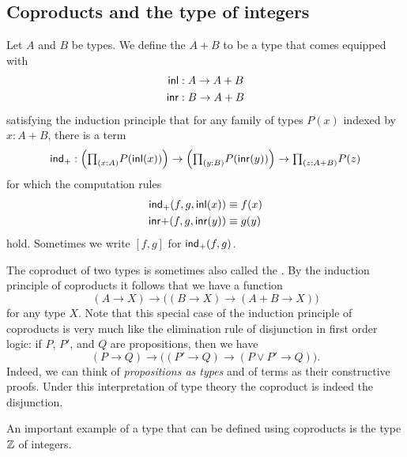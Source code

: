 \subsection{Coproducts and the type of integers}
\begin{defn}
Let $A$ and $B$ be types. We define the  $A+B$ to be a type that comes equipped with
\begin{align*}
{\mathsf{inl}} & : A \to A+B \\
{\mathsf{inr}} & : B \to A+B
\end{align*}
satisfying the induction principle that for any family of types $P(x)$ indexed by $x:A+B$, there is a term
\begin{equation*}
\ind{+} : \Big(\prd{x:A}P(\inl(x))\Big)\to\Big(\prd{y:B}P(\inr(y))\Big)\to\prd{z:A+B}P(z)
\end{equation*}
for which the computation rules
\begin{align*}
\mathsf{ind}_{+}(f,g,{\mathsf{inl}}(x)) & \equiv f(x) \\
{\mathsf{inr}}{+}(f,g,{\mathsf{inr}}(y)) & \equiv g(y)
\end{align*}
hold. Sometimes we write $[f,g]$ for $\mathsf{ind}_{+}(f,g)$.
\end{defn}

The coproduct of two types is sometimes also called the . By the induction principle of coproducts it follows that we have a function
\begin{equation*}
  (A\to X) \to \big((B\to X) \to (A+B\to X)\big)
\end{equation*}
for any type $X$. Note that this special case of the induction principle of coproducts is very much like the elimination rule of disjunction in first order logic: if $P$, $P'$, and $Q$ are propositions, then we have
\begin{equation*}
  (P\to Q)\to \big((P'\to Q)\to (P\lor P'\to Q)\big).
\end{equation*}
Indeed, we can think of \emph{propositions as types} and of terms as their constructive proofs. Under this interpretation of type theory the coproduct is indeed the disjunction.

An important example of a type that can be defined using coproducts is the type ${\mathbb{Z}}$ of integers.

